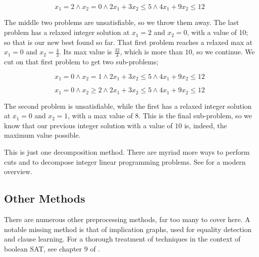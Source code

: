 \begin{equation}
    x_1 = 2 \wedge x_2 = 0 \wedge 2x_1 + 3x_2 \leq 5 \wedge 4x_1 + 9x_2 \leq 12
\end{equation}

The middle two problems are unsatisfiable, so we throw them away. The last problem has a relaxed integer solution at $x_1 = 2$ and $x_2 = 0$, with a value of 10; so that is our new best found so far. That first problem reaches a relaxed max at $x_1 = 0$ and $x_2 = \frac{4}{3}$. Its max value is $\frac{32}{3}$, which is more than $10$, so we continue. We cut on that first problem to get two sub-problems;

\begin{equation}
    x_1 = 0 \wedge x_2 = 1 \wedge 2x_1 + 3x_2 \leq 5 \wedge 4x_1 + 9x_2 \leq 12
\end{equation}

\begin{equation}
    x_1 = 0 \wedge x_2 \geq 2 \wedge 2x_1 + 3x_2 \leq 5 \wedge 4x_1 + 9x_2 \leq 12
\end{equation}

The second problem is unsatisfiable, while the first has a relaxed integer solution at $x_1 = 0$ and $x_2 = 1$, with a max value of $8$. This is the final sub-problem, so we know that our previous integer solution with a value of $10$ is, indeed, the maximum value possible.

This is just one decomposition method. There are myriad more ways to perform cuts and to decompose integer linear programming problems. See \citep{galati2010decomposition} for a modern overview.

\subsection{Other Methods}\label{sec:other-preproc}

There are numerous other preprocessing methods, far too many to cover here. A notable missing method is that of implication graphs, used for equality detection and clause learning. For a thorough treatment of techniques in the context of boolean SAT, see chapter 9 of \citep{biere2009handbook}.